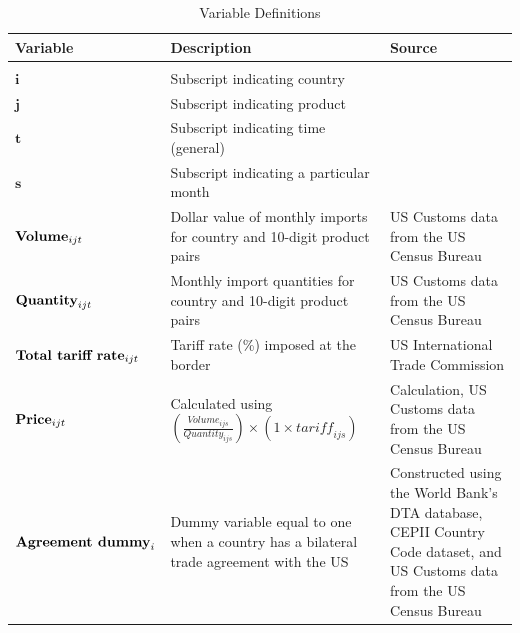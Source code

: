 \begin{table}[H]

    \centering
    \caption{Variable Definitions}
        
    \begin{threeparttable}
        
        \begin{tabular}{p{3.5cm} p{7cm} p{4cm}}
            
            \hline
            \textbf{Variable} & \textbf{Description} & \textbf{Source} \\
            \hline
            \\[-1.5ex]

            $\mathbf{i}$ & Subscript indicating country \\[1ex]

            $\mathbf{j}$ & Subscript indicating product \\[1ex]           

            $\mathbf{t}$ & Subscript indicating time (general) \\[1ex]           

            $\mathbf{s}$ & Subscript indicating a particular month \\[1ex]           

            $\textnormal{\textbf{Volume}}_{ijt}$ & Dollar value of monthly imports for country and 10-digit product pairs & US Customs data from the US Census Bureau \\[1ex]

            $\textnormal{\textbf{Quantity}}_{ijt}$ & Monthly import quantities for country and 10-digit product pairs & US Customs data from the US Census Bureau \\[1ex]

            $\textnormal{\textbf{Total tariff rate}}_{ijt}$ & Tariff rate (\%) imposed at the border & US International Trade Commission \\[1ex]

            $\textnormal{\textbf{Price}}_{ijt}$ & Calculated using $\left( \frac{\mathit{Volume}_{ijs}}{\mathit{Quantity}_{ijs}} \right) \times (1 \times \mathit{tariff}_{ijs})$ & Calculation, US Customs data from the US Census Bureau \\[1ex]
            
            $\textnormal{\textbf{Agreement dummy}}_{i}$ & Dummy variable equal to one when a country has a bilateral trade agreement with the US & Constructed using the World Bank's DTA database, CEPII Country Code dataset, and US Customs data from the US Census Bureau \\[1ex]                
            
            \hline
            
        \end{tabular}

    \end{threeparttable}

\end{table}

